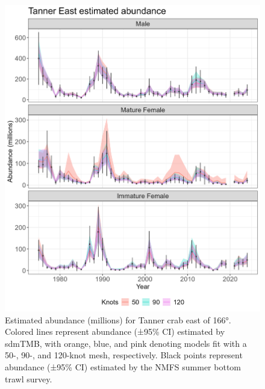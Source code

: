 \documentclass[
]{article}
\begin{document}
\begin{figure}

{\centering \includegraphics[width=1\linewidth,height=1\textheight]{../BAIRDI/Figures/TannerEast.abundance.index} 

}

\caption{Estimated abundance (millions) for Tanner crab east of 166°. Colored lines represent abundance (±95\% CI) estimated by sdmTMB, with orange, blue, and pink denoting models fit with a 50-, 90-, and 120-knot mesh, respectively. Black points represent abundance (±95\% CI) estimated by the NMFS summer bottom trawl survey.}\label{fig:Eastbairdi-abund-index}
\end{figure}
\end{document}
